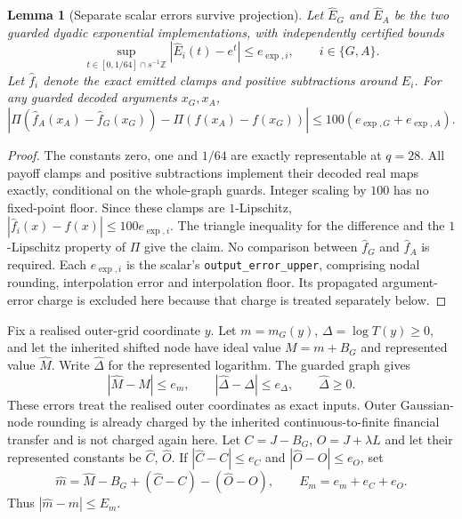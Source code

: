 \documentclass[11pt]{article}
\newtheorem{lemma}[theorem]{Lemma}
\begin{document}
\begin{lemma}[Separate scalar errors survive projection]
\label{lem:raw-asymmetric-scalar}
Let $\widehat E_G$ and $\widehat E_A$ be the two guarded dyadic
exponential implementations, with independently certified bounds
\begin{equation}
 \sup_{t\in[0,1/64]\cap s^{-1}\mathbb Z}
 |\widehat E_i(t)-e^t|\leq e_{\exp,i},\qquad i\in\{G,A\}.
\end{equation}
Let $\widehat f_i$ denote the exact emitted clamps and positive
subtractions around $\widehat E_i$. For any guarded decoded arguments
$x_G,x_A$,
\begin{equation}
 \left|\Pi(\widehat f_A(x_A)-\widehat f_G(x_G))
          -\Pi(f(x_A)-f(x_G))\right|
 \leq100(e_{\exp,G}+e_{\exp,A}).
\end{equation}
\end{lemma}
\begin{proof}
The constants zero, one and $1/64$ are exactly representable at
$q=28$. All payoff clamps and positive subtractions implement their
decoded real maps exactly, conditional on the whole-graph guards.
Integer scaling by $100$ has no fixed-point floor. Since these clamps
are $1$-Lipschitz, $|\widehat f_i(x)-f(x)|\leq100e_{\exp,i}$.
The triangle inequality for the difference and the $1$-Lipschitz
property of $\Pi$ give the claim. No comparison between
$\widehat f_G$ and $\widehat f_A$ is required. Each $e_{\exp,i}$
is the scalar's \texttt{output\_error\_upper}, comprising nodal
rounding, interpolation error and interpolation floor. Its propagated
argument-error charge is excluded here because that charge is treated
separately below.
\end{proof}

Fix a realised outer-grid coordinate $y$. Let $m=m_G(y)$,
$\Delta=\log T(y)\geq0$, and let the inherited shifted node have
ideal value $M=m+B_G$ and represented value $\widehat M$.
Write $\widehat\Delta$ for the represented logarithm. The guarded
graph gives
\begin{equation}
 |\widehat M-M|\leq e_m,\qquad
 |\widehat\Delta-\Delta|\leq e_\Delta,\qquad
 \widehat\Delta\geq0.
\end{equation}
These errors treat the realised outer coordinates as exact inputs.
Outer Gaussian-node rounding is already charged by the inherited
continuous-to-finite financial transfer and is not charged again here.
Let $C=J-B_G$, $O=J+\lambda L$ and let their represented constants
be $\widehat C$, $\widehat O$. If
$|\widehat C-C|\leq e_C$ and $|\widehat O-O|\leq e_O$, set
\begin{equation}
 \widehat m=\widehat M-B_G+(\widehat C-C)-(\widehat O-O),
 \qquad E_m=e_m+e_C+e_O.
\end{equation}
Thus $|\widehat m-m|\leq E_m$.
\end{document}
